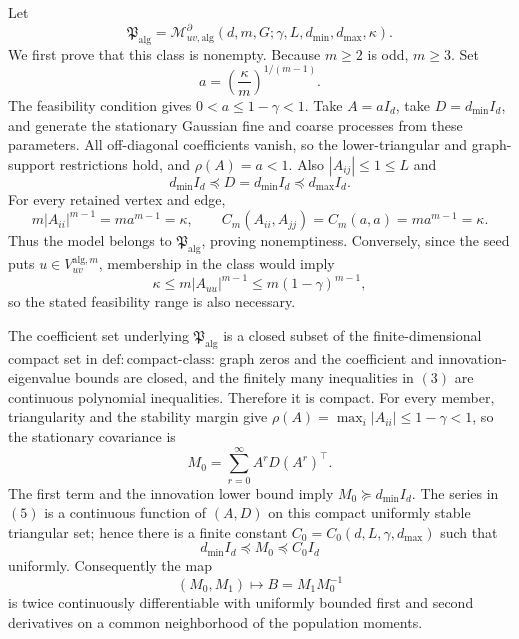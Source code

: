 Let
\[
 \mathfrak P_{\mathrm{alg}}
 =\mathcal M_{uv,\mathrm{alg}}^{\partial}
 (d,m,G;\gamma,L,d_{\min},d_{\max},\kappa).
\]
We first prove that this class is nonempty.  Because \(m\ge2\) is odd, \(m\ge3\).  Set
\[
 a=\left(\frac{\kappa}{m}\right)^{1/(m-1)}.
\tag{1}
\]
The feasibility condition gives \(0<a\le1-\gamma<1\).  Take \(A=aI_d\), take \(D=d_{\min}I_d\), and generate the stationary Gaussian fine and coarse processes from these parameters.  All off-diagonal coefficients vanish, so the lower-triangular and graph-support restrictions hold, and \(\rho(A)=a<1\).  Also \(|A_{ij}|\le1\le L\) and
\[
 d_{\min}I_d\preceq D=d_{\min}I_d\preceq d_{\max}I_d.
\tag{2}
\]
For every retained vertex and edge,
\[
 m|A_{ii}|^{m-1}=ma^{m-1}=\kappa,
 \qquad
 C_m(A_{ii},A_{jj})=C_m(a,a)=ma^{m-1}=\kappa.
\tag{3}
\]
Thus the model belongs to \(\mathfrak P_{\mathrm{alg}}\), proving nonemptiness.  Conversely, since the seed puts \(u\in V_{uv}^{\mathrm{alg},m}\), membership in the class would imply
\[
 \kappa\le m|A_{uu}|^{m-1}\le m(1-\gamma)^{m-1},
\tag{4}
\]
so the stated feasibility range is also necessary.

The coefficient set underlying \(\mathfrak P_{\mathrm{alg}}\) is a closed subset of the finite-dimensional compact set in \(\mathrm{def{:}compact\mbox{-}class}\): graph zeros and the coefficient and innovation-eigenvalue bounds are closed, and the finitely many inequalities in \((3)\) are continuous polynomial inequalities.  Therefore it is compact.  For every member, triangularity and the stability margin give \(\rho(A)=\max_i|A_{ii}|\le1-\gamma<1\), so the stationary covariance is
\[
 M_0=\sum_{r=0}^{\infty}A^rD(A^r)^\top.
\tag{5}
\]
The first term and the innovation lower bound imply \(M_0\succeq d_{\min}I_d\).  The series in \((5)\) is a continuous function of \((A,D)\) on this compact uniformly stable triangular set; hence there is a finite constant \(C_0=C_0(d,L,\gamma,d_{\max})\) such that
\[
 d_{\min}I_d\preceq M_0\preceq C_0I_d
\tag{6}
\]
uniformly.  Consequently the map
\[
 (M_0,M_1)\longmapsto B=M_1M_0^{-1}
\tag{7}
\]
is twice continuously differentiable with uniformly bounded first and second derivatives on a common neighborhood of the population moments.


